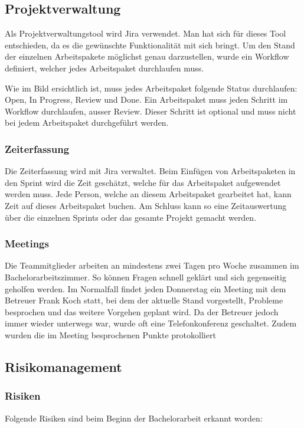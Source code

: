 \subsection{Projektverwaltung}
Als Projektverwaltungstool wird Jira verwendet. Man hat sich für dieses Tool entschieden, da es die gewünschte Funktionalität mit sich bringt. Um den Stand der einzelnen Arbeitspakete möglichst genau darzustellen, wurde ein Workflow definiert, welcher jedes Arbeitspaket durchlaufen muss.

Wie im Bild ersichtlich ist, muss jedes Arbeitspaket folgende Status durchlaufen: Open, In Progress, Review und Done. Ein Arbeitspaket muss jeden Schritt im Workflow durchlaufen, ausser Review. Dieser Schritt ist optional und muss nicht bei jedem Arbeitspaket durchgeführt werden.

\subsubsection*{Zeiterfassung}
Die Zeiterfassung wird mit Jira verwaltet. Beim Einfügen von Arbeitspaketen in den Sprint wird die Zeit geschätzt, welche für das Arbeitspaket aufgewendet werden muss. Jede Person, welche an diesem Arbeitspaket gearbeitet hat, kann Zeit auf dieses Arbeitspaket buchen. Am Schluss kann so eine Zeitauswertung über die einzelnen Sprints oder das gesamte Projekt gemacht werden.

\newpage

\subsubsection*{Meetings}
Die Teammitglieder arbeiten an mindestens zwei Tagen pro Woche zusammen im Bachelorarbeitszimmer. So können Fragen schnell geklärt und sich gegenseitig geholfen werden. Im Normalfall findet jeden Donnerstag ein Meeting mit dem Betreuer Frank Koch statt, bei dem der aktuelle Stand vorgestellt, Probleme besprochen und das weitere Vorgehen geplant wird. Da der Betreuer jedoch immer wieder unterwegs war, wurde oft eine Telefonkonferenz geschaltet. Zudem wurden die im Meeting besprochenen Punkte protokolliert

\subsection{Risikomanagement}
\subsubsection*{Risiken}
Folgende Risiken sind beim Beginn der Bachelorarbeit erkannt worden:

